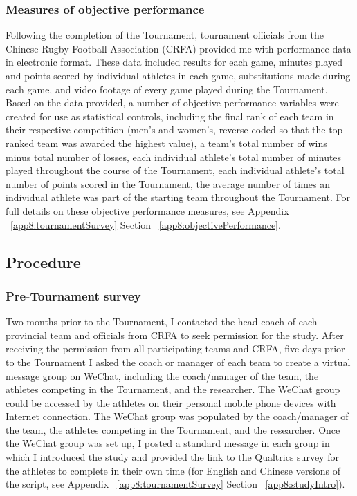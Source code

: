 \begin{CJK}{UTF8}{gbsn}
\subsubsection{\label{app8:objectivePerformance}Measures of objective performance}
Following the completion of the Tournament, tournament officials from the Chinese Rugby Football Association (CRFA) provided me with performance data in electronic format. These data included results for each game, minutes played and points scored by individual athletes in each game, substitutions made during each game, and video footage of every game played during the Tournament.  Based on the data provided, a number of objective performance variables were created for use as statistical controls, including the final rank of each team in their respective competition (men's and women's, reverse coded so that the top ranked team was awarded the highest value), a team's total number of wins minus total number of losses, each individual athlete's total number of minutes played throughout the course of the Tournament, each individual athlete's total number of points scored in the Tournament, the average number of times an individual athlete was part of the starting team throughout the Tournament. For full details on these objective performance measures, see Appendix ~\ref{app8:tournamentSurvey} Section ~\ref{app8:objectivePerformance}.











\subsection{Procedure}

\subsubsection{Pre-Tournament survey}
Two months prior to the Tournament, I contacted the head coach of each provincial team and officials from CRFA to seek permission for the study.  After receiving the permission from all participating teams and CRFA, five days prior to the Tournament I asked the coach or manager of each team to create a virtual message group on WeChat, including the coach/manager of the team, the athletes competing in the Tournament, and the researcher.  The WeChat group could be accessed by the athletes on their personal mobile phone devices with Internet connection. The WeChat group was populated by the coach/manager of the team, the athletes competing in the Tournament, and the researcher. Once the WeChat group was set up, I posted a standard message in each group in which I introduced the study and provided the link to the Qualtrics survey for the athletes to complete in their own time (for English and Chinese versions of the script, see Appendix ~\ref{app8:tournamentSurvey} Section ~\ref{app8:studyIntro}).


\end{CJK}
